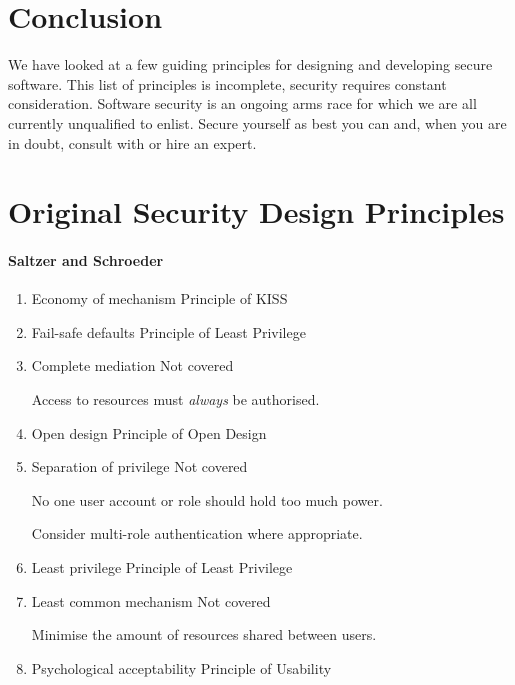 \section{Conclusion}
We have looked at a few guiding principles for designing and developing secure software.
This list of principles is incomplete, security requires constant consideration.
Software security is an ongoing arms race for which we are all currently unqualified to enlist.
Secure yourself as best you can and, when you are in doubt,
consult with or hire an expert.

\appendix
\section{Original Security Design Principles}\label{all-principles}

\paragraph{Saltzer and Schroeder}
\begin{enumerate}
    \item Economy of mechanism \dotfill Principle of KISS
    \item Fail-safe defaults \dotfill Principle of Least Privilege
    \item Complete mediation \dotfill Not covered
    
    \hspace{0.5em} Access to resources must \textsl{always} be authorised.

    \item Open design \dotfill Principle of Open Design
    \item Separation of privilege \dotfill Not covered
    
    \hspace{0.5em} No one user account or role should hold too much power.

    \hspace{0.5em} Consider multi-role authentication where appropriate.

    \item Least privilege \dotfill Principle of Least Privilege
    \item Least common mechanism \dotfill Not covered
    
    \hspace{0.5em} Minimise the amount of resources shared between users.

    \item Psychological acceptability \dotfill Principle of Usability
\end{enumerate}

